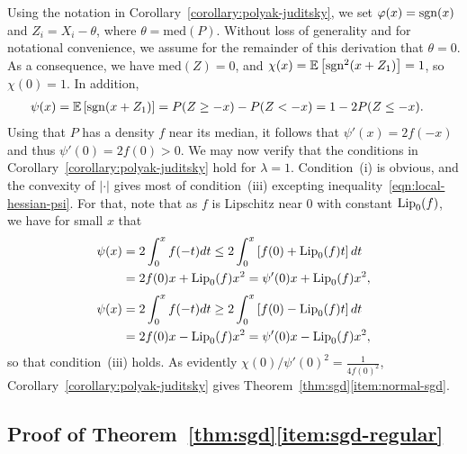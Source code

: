 Using the notation in Corollary~\ref{corollary:polyak-juditsky}, we set
$\varphi(x) = \mathrm{sgn}(x)$ and $Z_i = X_i - \theta$, where $\theta =
\mbox{med}(P)$. Without loss of generality and for notational convenience,
we assume for the remainder of this derivation that $\theta = 0$.
As a consequence, we have $\mbox{med}(Z) = 0$,
and $\chi(x) = \mathbb{E}\left[  \mathrm{sgn}^2(x+Z_1) \right]= 1$, so
$\chi(0) = 1$. In addition,
\begin{align*}
  \psi(x) & = \mathbb{E}\left[  \mathrm{sgn}(x+ Z_1) \right] =
  P(Z \ge -x) - P(Z < -x) = 1 - 2 P(Z \le -x).
\end{align*}
Using that $P$ has a density $f$ near its median, it follows that $\psi'(x)
= 2f(-x)$ and thus $\psi'(0) = 2f(0) > 0$.  We may now verify that the
conditions in Corollary~\ref{corollary:polyak-juditsky} hold for $\lambda =
1$. Condition~(i) is obvious, and the convexity of $|\cdot|$ gives most of
condition~(iii) excepting inequality~\eqref{eqn:local-hessian-psi}. For
that, note that as $f$ is Lipschitz near $0$ with constant ${\rm \textup{Lip}}_0(f)$, we 
have for small $x$ that
\begin{align*}
  \psi(x) & = 2 \int_0^x f(-t) dt
  \leq 2 \int_0^x \left[f(0) + {\rm \textup{Lip}}_0(f) t \right] dt \\
  & = 2 f(0) x + {\rm \textup{Lip}}_0(f) x^2 = \psi'(0) x + {\rm \textup{Lip}}_0(f) x^2,
\end{align*}
\begin{align*}
  \psi(x) & = 2 \int_0^x f(-t) dt
  \geq 2 \int_0^x \left[f(0) - {\rm \textup{Lip}}_0(f) t \right] dt
  \\
  & = 2 f(0) x - {\rm \textup{Lip}}_0(f) x^2 = \psi'(0) x - {\rm \textup{Lip}}_0(f) x^2,
\end{align*}
so that condition~(iii) holds.
As evidently $\chi(0) / \psi'(0)^2 = \frac{1}{4 f(0)^2}$,
Corollary~\ref{corollary:polyak-juditsky} gives
Theorem~\ref{thm:sgd}\eqref{item:normal-sgd}.

\subsection{Proof of Theorem~\ref{thm:sgd}\eqref{item:sgd-regular}}
\label{sec:proof-sgd-regular}

